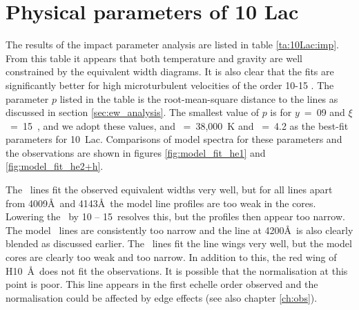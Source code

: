 \section{Physical parameters of 10 Lac}

The results of the impact parameter analysis are listed in table
\ref{ta:10Lac:imp}. From this table it appears that both temperature
and gravity are well constrained by the equivalent width
diagrams. It is also clear that the fits are significantly better for
high microturbulent velocities of the order 10-15 \kms. The parameter
$p$ listed in the table is the root-mean-square distance to the lines
as discussed in section \ref{sec:ew_analysis}. The smallest value of
$p$ is for $y$~=~09 and $\xi$~=~15~\kms, and we adopt these values,
and \teff~=~38,000~K and \logg~=~4.2 as the best-fit parameters for
10~Lac. Comparisons of model spectra for these parameters and the
observations are shown in figures \ref{fig:model_fit_he1} and
\ref{fig:model_fit_he2+h}.

The \hei\ lines fit the observed equivalent widths very well, but for
all lines apart from 4009\AA\ and 4143\AA\ the model line profiles are
too weak in the cores. Lowering the \vsini\ by 10 -- 15\kms\ resolves
this, but the profiles then appear too narrow. The model \heii\ lines
are consistently too narrow and the line at 4200\AA\ is also clearly
blended as discussed earlier. The \hi\ lines fit the line wings very
well, but the model cores are clearly too weak and too narrow. In
addition to this, the red wing of H10~\AA\ does not fit
the observations. It is possible that the normalisation at this point
is poor. This line appears in the first echelle order observed and the
normalisation could be affected by edge effects (see also chapter
\ref{ch:obs}).


